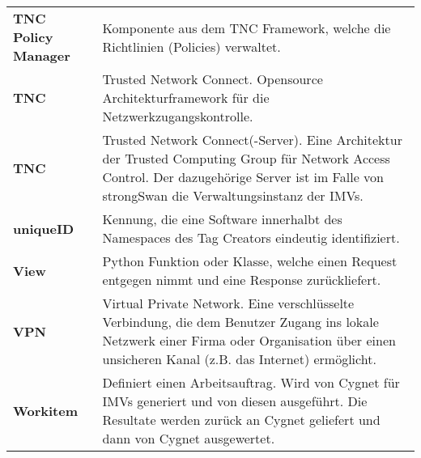 {\begin{longtable}{l >{\raggedright}p{}}
\textbf{TNC Policy Manager} & Komponente aus dem TNC Framework, welche die Richtlinien (Policies) verwaltet.\tabularnewline
\textbf{TNC} & Trusted Network Connect. Opensource Architekturframework für die Netzwerkzugangskontrolle.\tabularnewline
\textbf{TNC} & Trusted Network Connect(-Server). Eine Architektur der Trusted Computing Group für Network Access Control. Der dazugehörige Server ist im Falle von strongSwan die Verwaltungsinstanz der IMVs.\tabularnewline
\textbf{uniqueID} & Kennung, die eine Software innerhalbt des Namespaces des Tag Creators eindeutig identifiziert.\tabularnewline
\textbf{View} & Python Funktion oder Klasse, welche einen Request entgegen nimmt und eine Response zurückliefert.\tabularnewline
\textbf{VPN} & Virtual Private Network. Eine verschlüsselte Verbindung, die dem Benutzer Zugang ins lokale Netzwerk einer Firma oder Organisation über einen unsicheren Kanal (z.B. das Internet) ermöglicht.\tabularnewline
\textbf{Workitem} & Definiert einen Arbeitsauftrag. Wird von Cygnet für IMVs generiert und von diesen ausgeführt. Die Resultate werden zurück an Cygnet geliefert und dann von Cygnet ausgewertet.
\end{longtable}
}
